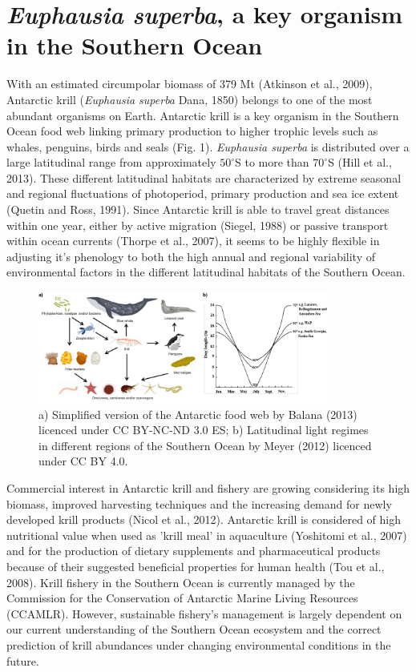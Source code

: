 \section*{\textit{Euphausia superba}, a key organism in the Southern Ocean}
With an estimated circumpolar biomass of 379 Mt (Atkinson et al., 2009),
Antarctic krill (\textit{Euphausia superba} Dana, 1850) belongs to one of the
most abundant organisms on Earth. Antarctic krill is a key organism in the
Southern Ocean food web linking primary production to higher trophic levels
such as whales, penguins, birds and seals (Fig. 1). \textit{Euphausia superba}
is distributed over a large latitudinal range from approximately $50^{\circ}$S
to more than $70^{\circ}$S (Hill et al., 2013). These different latitudinal
habitats are characterized by extreme seasonal and regional fluctuations of
photoperiod, primary production and sea ice extent (Quetin and Ross, 1991).
Since Antarctic krill is able to travel great distances within one year, either
by active migration (Siegel, 1988) or passive transport within ocean currents
(Thorpe et al., 2007), it seems to be highly flexible in adjusting it's
phenology to both the high annual and regional variability of environmental
factors in the different latitudinal habitats of the Southern Ocean. 


\begin{figure}
        \caption{a) Simplified version of the Antarctic food web by Balana
        (2013) licenced under CC BY-NC-ND 3.0 ES; b) Latitudinal light regimes
        in different regions of the Southern Ocean by Meyer (2012) licenced
        under CC BY 4.0.}
        \centering
        \includegraphics[width=0.85\textwidth]{../Figures/Figure1.pdf}
\end{figure}


Commercial interest in Antarctic krill and fishery are growing considering its
high biomass, improved harvesting techniques and the increasing demand for
newly developed krill products (Nicol et al., 2012). Antarctic krill is
considered of high nutritional value when used as 'krill meal' in aquaculture
(Yoshitomi et al., 2007) and for the production of dietary supplements and
pharmaceutical products because of their suggested beneficial properties for
human health (Tou et al., 2008). Krill fishery in the Southern Ocean is
currently managed by the Commission for the Conservation of Antarctic Marine
Living Resources (CCAMLR). However, sustainable fishery's management is largely
dependent on our current understanding of the Southern Ocean ecosystem and the
correct prediction of krill abundances under changing environmental conditions
in the future. 

